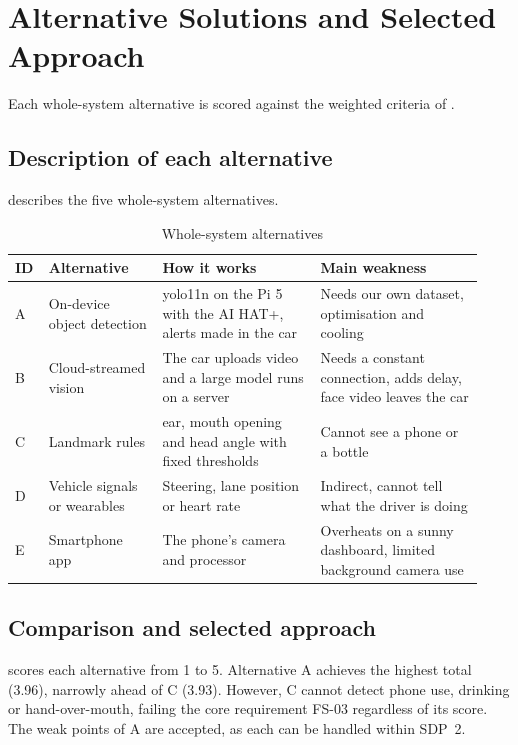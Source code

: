 \section{Alternative Solutions and Selected Approach}
\label{sec:alternatives}

Each whole-system alternative is scored against the weighted criteria of .

\subsection{Description of each alternative}

 describes the five whole-system alternatives.

\begin{table}[htbp]
\centering
\caption{Whole-system alternatives}
\label{tab:ch4-alts}
\footnotesize
\setlength{\tabcolsep}{3pt}
\renewcommand{\arraystretch}{1.15}
\begin{tabular}{|p{0.050\linewidth}|p{0.230\linewidth}|p{0.320\linewidth}|p{0.330\linewidth}|}
\hline
\textbf{ID} & \textbf{Alternative} & \textbf{How it works} & \textbf{Main weakness} \\
\hline
A & On-device object detection & \gls{yolo}11n on the Pi 5 with the AI HAT+, alerts made in the car & Needs our own dataset, optimisation and cooling \\
\hline
B & Cloud-streamed vision & The car uploads video and a large model runs on a server & Needs a constant connection, adds delay, face video leaves the car \\
\hline
C & Landmark rules & \gls{ear}, mouth opening and head angle with fixed thresholds & Cannot see a phone or a bottle \\
\hline
D & Vehicle signals or wearables & Steering, lane position or heart rate & Indirect, cannot tell what the driver is doing \\
\hline
E & Smartphone app & The phone's camera and processor & Overheats on a sunny dashboard, limited background camera use \\
\hline
\end{tabular}
\end{table}


\subsection{Comparison and selected approach}

 scores each alternative from 1 to 5. Alternative A achieves the highest total (3.96), narrowly ahead of C (3.93). However, C cannot detect phone use, drinking or hand-over-mouth, failing the core requirement FS-03 regardless of its score. The weak points of A are accepted, as each can be handled within SDP~2.

